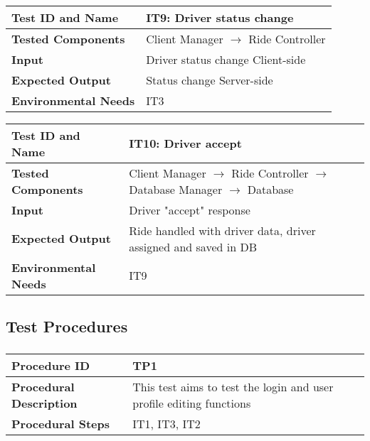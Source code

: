 \subsubsection{}

\begin{tabular}{l p{}}
    \hline
    \textbf{Test ID and Name} & \textbf{IT9: Driver status change}\\
    \hline
    \textbf{Tested Components} & Client Manager $\rightarrow$ Ride Controller\\
    \hline
    \textbf{Input} & Driver status change Client-side\\
    \hline
    \textbf{Expected Output} & Status change Server-side\\
    \hline
    \textbf{Environmental Needs} & IT3\\
    \hline
\end{tabular}

\vspace{2em}

\noindent\begin{tabular}{l p{}}
    \hline
    \textbf{Test ID and Name} & \textbf{IT10: Driver accept}\\
    \hline
    \textbf{Tested Components} & Client Manager $\rightarrow$ Ride Controller $\rightarrow$ Database Manager $\rightarrow$ Database\\
    \hline
    \textbf{Input} & Driver "accept" response\\
    \hline
    \textbf{Expected Output} & Ride handled with driver data, driver assigned and saved in DB\\
    \hline
    \textbf{Environmental Needs} & IT9\\
    \hline
\end{tabular}

\subsection{Test Procedures}

\subsubsection{}

\noindent\begin{tabular}{l p{}}
    \hline
    \textbf{Procedure ID} & \textbf{TP1}\\
    \hline
    \textbf{Procedural Description} & This test aims to test the login and user profile editing functions \\
    \hline
    \textbf{Procedural Steps} & IT1, IT3, IT2\\
\end{tabular}

